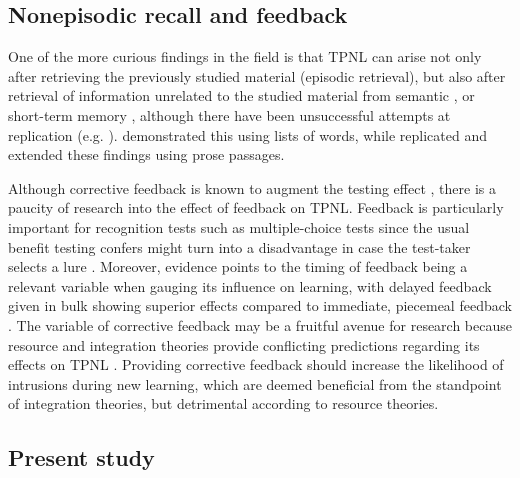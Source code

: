 \documentclass[../main.tex]{subfiles}
\begin{document}
\hypertarget{nonepisodic}{%
\subsection{Nonepisodic recall and feedback}}

One of the more curious findings in the field is that TPNL can arise not 
only after retrieving the previously studied material (episodic retrieval), 
but also after retrieval of information unrelated to the studied material 
from semantic \citep{divisRetrievalSpeedsContext2014, 
pastotterRetrievalLearningFacilitates2011}, or short-term memory 
\citep{pastotterRetrievalLearningFacilitates2011}, although there have been 
unsuccessful attempts at replication (e.g. 
\citealp{weinsteinNotAllRetrieval2015}). 
\cite{pastotterRetrievalLearningFacilitates2011} demonstrated this using 
lists of words, while \cite{divisRetrievalSpeedsContext2014} replicated and 
extended these findings using prose passages.

Although corrective feedback is known to augment the testing effect 
\citep{roedigeriiiCriticalRoleRetrieval2011}, there is a paucity of research 
into the effect of feedback on TPNL. Feedback is particularly important for 
recognition tests such as multiple-choice tests since the usual benefit 
testing confers might turn into a disadvantage in case the test-taker 
selects a lure \citep{roedigerPositiveNegativeConsequences2005, 
marshMemorialConsequencesMultiplechoice2007}. Moreover, evidence points to 
the timing of feedback being a relevant variable when gauging its influence 
on learning, with delayed feedback given in bulk showing superior effects 
compared to immediate, piecemeal feedback 
\citep{metcalfeDelayedImmediateFeedback2009,butlerEffectTypeTiming2007, 
butlerFeedbackEnhancesPositive2008,smithLearningFeedbackSpacing2010}.
The variable of corrective feedback may be a fruitful avenue for research 
because resource and integration theories provide conflicting predictions 
regarding its effects on TPNL \citep{chanRetrievalPotentiatesNew2018}. 
Providing corrective feedback should increase the likelihood of intrusions 
during new learning, which are deemed beneficial from the standpoint of 
integration theories, but detrimental according to resource theories.


\subsection{Present study\label{present}}
\end{document}

